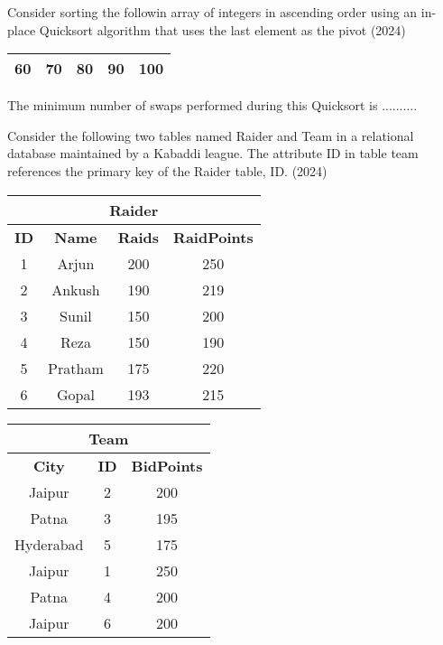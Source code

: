     \item Consider sorting the followin array of integers in ascending order using an in-place Quicksort algorithm that uses the last element as the pivot \hfill (2024)
    \begin{table}
        \centering
        \begin{tabular}{|c|c|c|c|c|}
            \hline
            60&70&80&90&100\\
            \hline 
        \end{tabular}
    \end{table}
    The minimum number of swaps performed during this Quicksort is ..........
    \item Consider the following two tables named Raider and Team in a relational database maintained by a Kabaddi league. The attribute ID in table team references the primary key of the Raider table, ID. \hfill (2024)
    \begin{table}
        \centering
        \begin{tabular}{|c|c|c|c|}
            \hline
            \multicolumn{4}{|c|}{\textbf{Raider}} \\
            \hline
            \textbf{ID} & \textbf{Name} & \textbf{Raids} & \textbf{RaidPoints} \\
            \hline
            1 & Arjun & 200 & 250 \\
            2 & Ankush & 190 & 219 \\
            3 & Sunil & 150 & 200 \\
            4 & Reza & 150 & 190 \\
            5 & Pratham & 175 & 220 \\
            6 & Gopal & 193 & 215 \\
            \hline
        \end{tabular}
    \end{table}
    \begin{table}
        \centering
        \renewcommand{\arraystretch}{1.2} %
\begin{tabular}{|c|c|c|}
\hline
\multicolumn{3}{|c|}{\textbf{Team}} \\
\hline
\textbf{City} & \textbf{ID} & \textbf{BidPoints} \\
\hline
Jaipur & 2 & 200 \\
Patna & 3 & 195 \\
Hyderabad & 5 & 175 \\
Jaipur & 1 & 250 \\
Patna & 4 & 200 \\
Jaipur & 6 & 200 \\
\hline
\end{tabular}
    \end{table}
